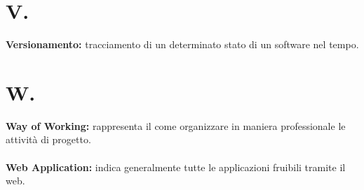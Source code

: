 \documentclass[a4paper, 12pt]{article}
\begin{document}
\newpage
\section{V.}
\textbf{Versionamento:} tracciamento di un determinato stato di un software nel tempo. \\

\newpage
\section{W.}
\textbf{Way of Working:} rappresenta il come organizzare in maniera professionale le attività di progetto.\\ \\
\textbf{Web Application:} indica generalmente tutte le applicazioni fruibili tramite il web.
\end{document}
